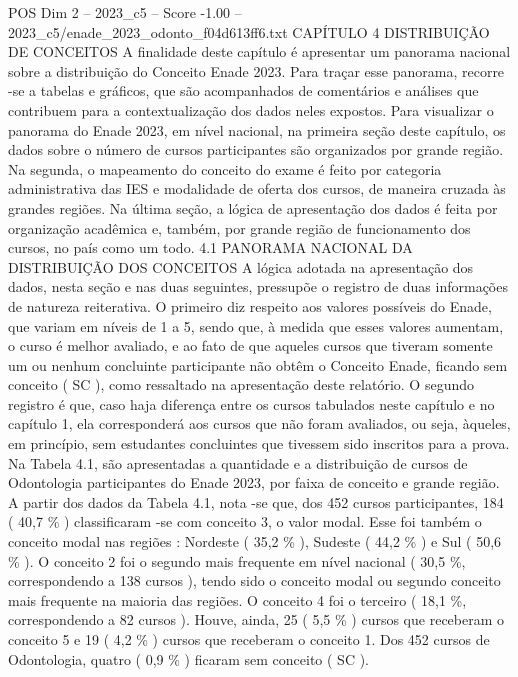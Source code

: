 \begin{textsample}{POS Dim 2 – 2023\_c5 – Score -1.00 – 2023\_c5/enade\_2023\_odonto\_f04d613ff6.txt}  \label{ex:f2_pos_259}
CAPÍTULO 4 DISTRIBUIÇÃO DE CONCEITOS A finalidade deste capítulo é apresentar um panorama nacional sobre a distribuição do Conceito Enade 2023.
Para traçar esse panorama, recorre -se a tabelas e gráficos, que são acompanhados de comentários e análises que contribuem para a contextualização dos dados neles expostos.
Para visualizar o panorama do Enade 2023, em nível nacional, na primeira seção deste capítulo, os dados sobre o número de cursos participantes são organizados por grande região.
Na segunda, o mapeamento do conceito do exame é feito por categoria administrativa das IES e modalidade de oferta dos cursos, de maneira cruzada às grandes regiões.
Na última seção, a lógica de apresentação dos dados é feita por organização acadêmica e, também, por grande região de funcionamento dos cursos, no país como um todo. 4.1 PANORAMA NACIONAL DA DISTRIBUIÇÃO DOS CONCEITOS A lógica adotada na apresentação dos dados, nesta seção e nas duas seguintes, pressupõe o registro de duas informações de natureza reiterativa.
O primeiro diz respeito aos valores possíveis do Enade, que variam em níveis de 1 a 5, sendo que, à medida que esses valores aumentam, o curso é melhor avaliado, e ao fato de que aqueles cursos que tiveram somente um ou nenhum concluinte participante não obtêm o Conceito Enade, ficando sem conceito ( SC ), como ressaltado na apresentação deste relatório.
O segundo registro é que, caso haja diferença entre os cursos tabulados neste capítulo e no capítulo 1, ela corresponderá aos cursos que não foram avaliados, ou seja, àqueles, em princípio, sem estudantes concluintes que tivessem sido inscritos para a prova.
Na Tabela 4.1, são apresentadas a quantidade e a distribuição de cursos de Odontologia participantes do Enade 2023, por faixa de conceito e grande região.
A partir dos dados da Tabela 4.1, nota -se que, dos 452 cursos participantes, 184 ( 40,7 \% ) classificaram -se com conceito 3, o valor modal.
Esse foi também o conceito modal nas regiões : Nordeste ( 35,2 \% ), Sudeste ( 44,2 \% ) e Sul ( 50,6 \% ).
O conceito 2 foi o segundo mais frequente em nível nacional ( 30,5 \%, correspondendo a 138 cursos ), tendo sido o conceito modal ou segundo conceito mais frequente na maioria das regiões.
O conceito 4 foi o terceiro ( 18,1 \%, correspondendo a 82 cursos ).
Houve, ainda, 25 ( 5,5 \% ) cursos que receberam o conceito 5 e 19 ( 4,2 \% ) cursos que receberam o conceito 1.
Dos 452 cursos de Odontologia, quatro ( 0,9 \% ) ficaram sem conceito ( SC ).

\end{textsample}
